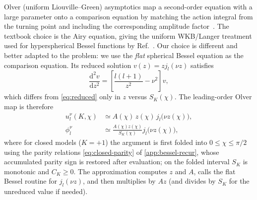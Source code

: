 \documentclass[prd, twocolumn, superscriptaddress, tightenlines, longbibliography, nofootinbib, eqsecnum, amsfonts, amsmath, floatfix, notitlepage]{revtex4-2}
\newcommand{\dd}{\mathrm{d}}
\newcommand{\SK}{S_K}
\newcommand{\CK}{C_K}
\newcommand{\jl}{j_l}
\begin{document}
Olver (uniform Liouville--Green) asymptotics map a second-order equation with a
large parameter onto a comparison equation by matching the action integral from
the turning point and including the corresponding amplitude
factor~\cite{olver1958uniform,olver}. The textbook choice is the Airy equation, giving the uniform
WKB/Langer treatment used for hyperspherical Bessel functions by
Ref.~\cite{Kosowsky:1998nc}. Our choice is different
and better adapted to the problem: we use the \emph{flat} spherical Bessel
equation as the comparison equation. Its reduced solution $v(z)=z\jl(\nu z)$
satisfies
\begin{equation}
  \frac{\dd^2v}{\dd z^2}=\left[\frac{l(l+1)}{z^2}-\nu^2\right]v,
  \label{eq:flat-comparison}
\end{equation}
which differs from \cref{eq:reduced} only in $z$ versus $\SK(\chi)$. The
leading-order Olver map is therefore
\begin{equation}
  \begin{aligned}
  u_l^\nu(K,\chi)&\simeq A(\chi)\,z(\chi)\,\jl\!\big(\nu z(\chi)\big),\\
  \phi_l^\nu&\simeq \frac{A(\chi)z(\chi)}{\SK(\chi)}\jl\!\big(\nu z(\chi)\big),
  \end{aligned}
  \label{eq:basic-olver}
\end{equation}
where for closed models ($K=+1$) the argument is first folded into
$0\le\chi\le\pi/2$ using the parity relations \cref{eq:closed-parity} of
\cref{app:bessel-recur}, whose accumulated parity sign is restored after
evaluation; on the folded interval $\SK$ is monotonic and $\CK\ge0$. The
approximation computes $z$ and $A$, calls the flat
Bessel routine for $\jl(\nu z)$, and then multiplies by $Az$ (and divides by $\SK$ for the unreduced
value if needed).
\end{document}
